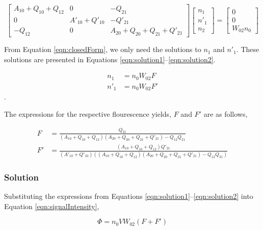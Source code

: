 \begin{equation}
  \left[
    \begin{matrix}
      A_{10} + Q_{10} + Q_{12} & 0 & -Q_{21}\\
      0 & A'_{10} + Q'_{10} & -Q'_{21}\\
      -Q_{12} & 0 & A_{20} + Q_{20} + Q_{21} + Q'_{21}
    \end{matrix}
  \right]\left[
    \begin{matrix}
      n_1\\
      n'_1\\
      n_2
    \end{matrix}
  \right] = \left[
    \begin{matrix}
      0\\
      0\\
      W_{02}n_0
    \end{matrix}
  \right]
  \label{eqn:closedForm}
\end{equation}

From Equation \ref{eqn:closedForm}, we only need the solutions to \(n_1\) and \(n'_1\).
These solutions are presented in Equations \ref{eqn:solution1}--\ref{eqn:solution2}.

\begin{align}
  n_1 &= n_0W_{02}F
  \label{eqn:solution1}\\
  n'_1 &= n_0W_{02}F'
  \label{eqn:solution2}
\end{align}.

The expressions for the respective flourescence yields, \(F\) and \(F'\) are as follows,

\begin{align}
  F &= \frac{ Q_{21} }{ ( A_{10} + Q_{10} + Q_{12} )( A_{20} + Q_{20} + Q_{21} + Q'_{21} ) - Q_{12}Q_{21} }
  \label{eqn:flourescenceYield1}\\
  F' &= \frac{ ( A_{10} + Q_{10} + Q_{12} )Q'_{21} }{ ( A'_{10} + Q'_{10} ) ( ( A_{10} + Q_{10} + Q_{12} )( A_{20} + Q_{20} + Q_{21} + Q'_{21} ) - Q_{12}Q_{21} ) }
  \label{eqn:fluorescenceYield2}
\end{align}

\subsubsection{Solution}

Substituting the expressions from Equations \ref{eqn:solution1}--\ref{eqn:solution2} into Equation \ref{eqn:signalIntensity},

\begin{equation}
  \Phi = n_0VW_{02}(F+F')
  \label{eqn:improvedModel-weak}
\end{equation}

